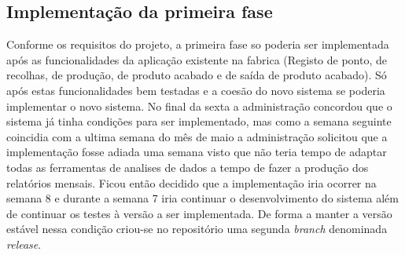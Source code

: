 \subsection{Implementação da primeira fase}
Conforme os requisitos do projeto, a primeira fase so poderia ser implementada após as funcionalidades da aplicação existente na fabrica (Registo de ponto, de recolhas, de produção, de produto acabado e de saída de produto acabado). Só após estas funcionalidades bem testadas e a coesão do novo sistema se poderia implementar o novo sistema. No final da sexta a administração concordou que o sistema já tinha condições para ser implementado, mas como a semana seguinte coincidia com a ultima semana do mês de maio a administração solicitou que a implementação fosse adiada uma semana visto que não teria tempo de adaptar todas as ferramentas de analises de dados a tempo de fazer a produção dos relatórios mensais. Ficou então decidido que a implementação iria ocorrer na semana 8 e durante a semana 7 iria continuar o desenvolvimento do sistema além de continuar os testes à versão a ser implementada. De forma a manter a versão estável nessa condição criou-se no repositório uma segunda \textit{branch} denominada \textit{release}.

